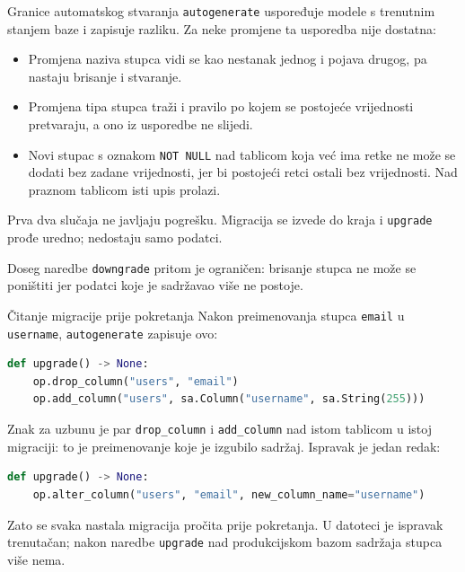 \begin{frame}{Granice automatskog stvaranja}
\texttt{autogenerate} uspoređuje modele s trenutnim stanjem baze i zapisuje razliku. Za neke promjene ta usporedba nije dostatna:

\begin{itemize}
  \item Promjena naziva stupca vidi se kao nestanak jednog i pojava drugog, pa nastaju brisanje i stvaranje.
  \item Promjena tipa stupca traži i pravilo po kojem se postojeće vrijednosti pretvaraju, a ono iz usporedbe ne slijedi.
  \item Novi stupac s oznakom \texttt{NOT NULL} nad tablicom koja već ima retke ne može se dodati bez zadane vrijednosti, jer bi postojeći retci ostali bez vrijednosti. Nad praznom tablicom isti upis prolazi.
\end{itemize}

\vspace{0.5em}
Prva dva slučaja ne javljaju pogrešku. Migracija se izvede do kraja i \texttt{upgrade} prođe uredno; nedostaju samo podatci.

\vspace{0.3em}
Doseg naredbe \texttt{downgrade} pritom je ograničen: brisanje stupca ne može se poništiti jer podatci koje je sadržavao više ne postoje.
\end{frame}

\begin{frame}[fragile]{Čitanje migracije prije pokretanja}
Nakon preimenovanja stupca \texttt{email} u \texttt{username}, \texttt{autogenerate} zapisuje ovo:

\begin{lstlisting}[language=python]
def upgrade() -> None:
    op.drop_column("users", "email")
    op.add_column("users", sa.Column("username", sa.String(255)))
\end{lstlisting}

\vspace{0.3em}
Znak za uzbunu je par \texttt{drop\_column} i \texttt{add\_column} nad istom tablicom u istoj migraciji: to je preimenovanje koje je izgubilo sadržaj. Ispravak je jedan redak:

\begin{lstlisting}[language=python]
def upgrade() -> None:
    op.alter_column("users", "email", new_column_name="username")
\end{lstlisting}

\vspace{0.3em}
Zato se svaka nastala migracija pročita prije pokretanja. U datoteci je ispravak trenutačan; nakon naredbe \texttt{upgrade} nad produkcijskom bazom sadržaja stupca više nema.
\end{frame}

